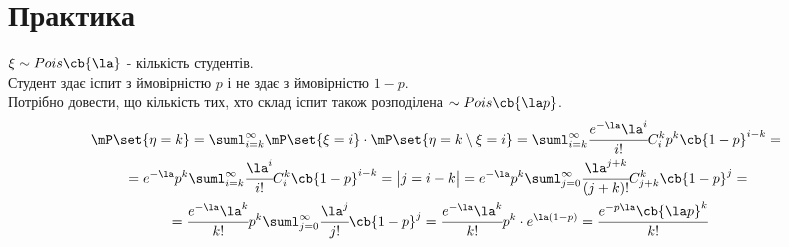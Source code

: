 \section{Практика}
\begin{tsk}
$\xi\sim Pois\cb{\la}$ - кількість студентів. \\
Студент здає іспит з ймовірністю $p$ і не здає з ймовірністю $1-p$.\\
Потрібно довести, що кількість тих, хто склад іспит також розподілена $\sim Pois\cb{\la p}$.
\begin{multline}
\mP\set{\eta=k} = \suml_{i=k}^\infty \mP\set{\xi=i}\cdot \mP\set{\eta=k\setminus\xi=i} = \suml_{i=k}^\infty \cfrac{e^{-\la}\la^i}{i!} C^k_i p^k \cb{1-p}^{i-k} ={}\\{}= e^{-\la} p^k \suml_{i=k}^\infty \cfrac{\la^i}{i!} C^k_i \cb{1-p}^{i-k} = \begin{vmatrix}
j=i-k
\end{vmatrix} = e^{-\la} p^k \suml_{j=0}^\infty \cfrac{\la^{j+k}}{(j+k)!} C^k_{j+k} \cb{1-p}^{j} = {} \\ {}= \cfrac{e^{-\la}\la^k}{k!} p^k \suml_{j=0}^\infty \cfrac{\la^j}{j!} \cb{1-p}^j =  \cfrac{e^{-\la}\la^k}{k!} p^k \cdot e^{\la(1-p)} = \cfrac{e^{-p\la} \cb{\la p}^k}{k!}
\end{multline}
\end{tsk} 
